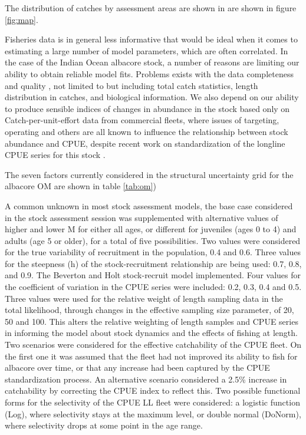 The distribution of catches by assessment areas are shown in are shown in figure \ref{fig:map}.
   
Fisheries data is in general less informative that would be ideal when it comes to estimating a large number of model parameters, which are often correlated. In the case of the Indian Ocean albacore stock, a number of reasons are limiting our ability to obtain reliable model fits. Problems exists with the data completeness and quality \citep{IOTC2016WPTmT0607}, not limited to but including total catch statistics, length distribution in catches, and biological information. We also depend on our ability to produce sensible indices of changes in abundance in the stock based only on Catch-per-unit-effort data from commercial fleets, where issues of targeting, operating and others are all known to influence the relationship between stock abundance and CPUE, despite recent work on standardization of the longline CPUE series for this stock \citep{oyleKL2016}.

The seven factors currently considered in the structural uncertainty grid for the albacore OM are shown in  table \ref{tab:om})

A common unknown in most stock assessment models, the base case considered in the stock assessment session was supplemented with alternative values of higher and lower M for either all ages, or different for juveniles (ages 0 to 4) and adults (age 5 or older), for a total of five possibilities. Two values were considered for the true variability of recruitment in the population, 0.4 and 0.6. Three values for the steepness (h) of the stock-recruitment relationship are being used: 0.7, 0.8, and 0.9. The Beverton and Holt stock-recruit model implemented. Four values for the coefficient of variation in the CPUE series were included: 0.2, 0.3, 0.4 and 0.5. Three values were used for the relative weight of length sampling data in the total likelihood, through changes in the effective sampling size parameter, of 20, 50 and 100. This alters the relative weighting of length samples and CPUE series in informing the model about stock dynamics and the effects of fishing at length. Two scenarios were considered for the effective catchability of the CPUE fleet. On the first one it was assumed that the fleet had not improved its ability to fish for albacore over time, or that any increase had been captured by the CPUE standardization process. An alternative scenario considered a 2.5\% increase in catchability by correcting the CPUE index to reflect this.  Two possible functional forms for the selectivity of the CPUE LL fleet were considered: a logistic function (Log), where selectivity stays at the maximum level, or double normal (DoNorm), where selectivity drops at some point in the age range.

